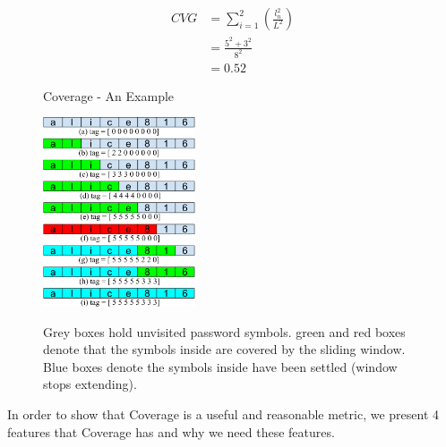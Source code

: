\documentclass{sig-alternate}
\begin{document}
\begin{equation}
\begin{split}
CVG & = \sum_{i=1}^2 (\frac{l_n^2}{L^2}) \\
&= \frac{5^2 + 3^2}{8^2}\\
&= 0.52
\end{split}
\end{equation}

\begin{figure}[h!]
\centering
  \caption{Coverage - An Example}{}
  \label{f1}
  \centering
    \includegraphics[width=0.4\textwidth]{fig/cvgfig}
\caption*{Grey boxes hold unvisited password symbols. green and red boxes denote that the symbols inside are covered by the sliding window. Blue boxes denote the symbols inside have been settled (window stops extending). }

\end{figure}


In order to show that Coverage is a useful and reasonable metric, we present 4 features that Coverage has and why we need these features.
\end{document}
